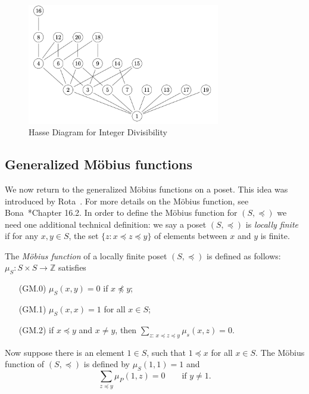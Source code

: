 \documentclass{amsart}
\theoremstyle{definition}
\newcommand{\NN}{\mathbb{N}}
\newcommand{\ZZ}{\mathbb{Z}}
\newcommand{\Mobius}{M\"obius}
\begin{document}
\begin{figure}[h]\label{Integer}
\centering
\includegraphics[width= 0.75\textwidth]{Hasse_Diagram_for_Integer_Divisibility.png}
\caption{Hasse Diagram for Integer Divisibility}
\label{fig:hasse-divisor}
\end{figure}


\subsection{Generalized \Mobius{} functions}\label{sec:gen-mobius}

We now return to the generalized \Mobius{} functions on a poset.
This idea was introduced by Rota~\cite{rota}.
For more details on the \Mobius{} function, see Bona~\cite{Bona}*{Chapter 16.2}. 
In order to define the \Mobius{} function for $(S, \preccurlyeq)$ we need one additional technical definition:
we say a poset $(S, \preccurlyeq)$ is {\em locally finite} if for any $x, y \in S$, the set $\{z : x \preccurlyeq z \preccurlyeq y\}$ of elements between $x$ and $y$ is finite.

The {\em \Mobius{} function} of a locally finite poset $(S, \preccurlyeq)$ is defined as follows:
$\mu_S : S \times S \to \ZZ$ satisfies
\begin{enumerate}
  \item[(GM.0)] 
    $\mu_S(x, y) = 0$ if $x \not\preccurlyeq y$;
  \item[(GM.1)] 
    $\mu_S(x, x) = 1$ for all $x \in S$;
  \item[(GM.2)] 
    if $x \preccurlyeq y$ and $x \neq y$, then $\displaystyle \sum_{z :\, x \preccurlyeq z   \preccurlyeq y} \mu_s(x, z) = 0$.
\end{enumerate}

Now suppose there is an element $1 \in S$, such that $1 \preccurlyeq x$ for all $x \in S$.
The \Mobius{} function of $(S, \preccurlyeq)$ is defined by $\mu_S(1, 1) = 1$ and
\[
    \sum_{z \preccurlyeq y} \mu_P(1, z) = 0 \qquad\text{if } y \neq 1.
\]
\end{document}
